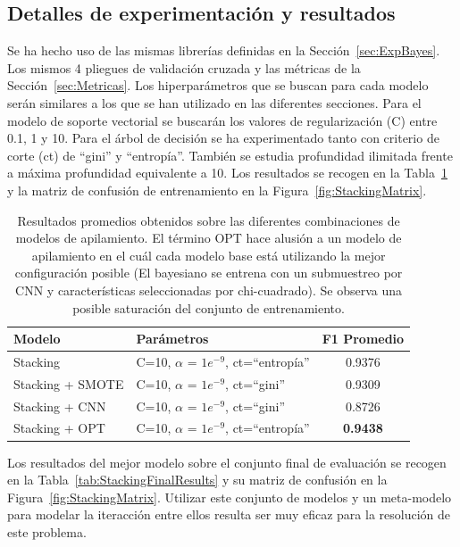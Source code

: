 \documentclass[12pt,letterpaper]{article}
\begin{document}
\subsection{Detalles de experimentación y resultados} 
Se ha hecho uso de las mismas librerías definidas en la Sección~\ref{sec:ExpBayes}. Los mismos 4 pliegues de validación cruzada y las métricas de la Sección~\ref{sec:Metricas}.
Los hiperparámetros que se buscan para cada modelo serán similares a los que se han utilizado en las diferentes secciones.
Para el modelo de soporte vectorial se buscarán los valores de regularización (C) entre 0.1, 1 y 10.
Para el árbol de decisión se ha experimentado tanto con criterio de corte (ct) de ``gini'' y ``entropía''. También se estudia profundidad ilimitada frente a máxima profundidad equivalente a 10.
Los resultados se recogen en la Tabla~\ref{tab:StackingResults} y la matriz de confusión de entrenamiento en la Figura~\ref{fig:StackingMatrix}.

\begin{table}[!ht]
    \centering
    \begin{tabular}{llc}
        \hline
        \textbf{Modelo} & \textbf{Parámetros} &\textbf{F1 Promedio} \\\hline
        Stacking & C=10, $\alpha$ = $1e^{-9}$, ct=``entropía''& 0.9376\\ 
        Stacking + SMOTE & C=10, $\alpha$ = $1e^{-9}$, ct=``gini''& 0.9309 \\ 
        Stacking + CNN & C=10, $\alpha$ = $1e^{-9}$, ct=``gini'' & 0.8726 \\ 
        Stacking + OPT & C=10, $\alpha$ = $1e^{-9}$, ct=``entropía''& \textbf{0.9438} \\ 
        \hline
    \end{tabular}
    \caption{Resultados promedios obtenidos sobre las diferentes combinaciones de modelos de apilamiento. El término OPT hace alusión a un modelo de apilamiento en el cuál cada modelo base está utilizando la mejor configuración posible (El bayesiano se entrena con un submuestreo por CNN y características seleccionadas por chi-cuadrado). Se observa una posible saturación del conjunto de entrenamiento.} 
    \label{tab:StackingResults}
\end{table}

Los resultados del mejor modelo sobre el conjunto final de evaluación se recogen en la Tabla~\ref{tab:StackingFinalResults} y su matriz de confusión en la Figura~\ref{fig:StackingMatrix}.
Utilizar este conjunto de modelos y un meta-modelo para modelar la iteracción entre ellos resulta ser muy eficaz para la resolución de este problema.
\end{document}
